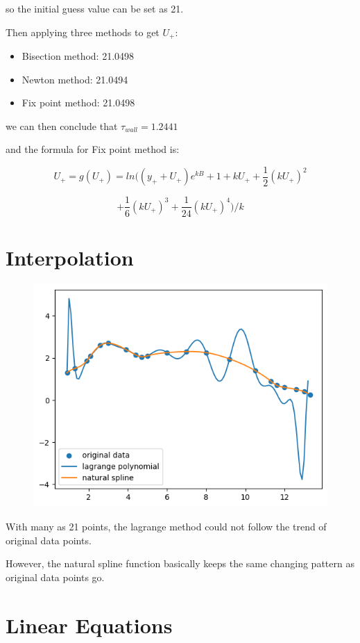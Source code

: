 \documentclass[conference]{IEEEtran}
\begin{document}
so the initial guess value can be set as 21.

Then applying three methods to get $U_+$:

\begin{itemize}
	\item Bisection method: 21.0498
	\item Newton method: 21.0494
	\item Fix point method: 21.0498
\end{itemize}

we can then conclude that $\tau_{wall} = 1.2441$

and the formula for Fix point method is:

$$
U_+ = g(U_+) = ln((y_+ + U_+)e^{kB} + 1 + kU_+ + \frac12(kU_+)^2
$$

$$
 + \frac16(kU_+)^3 + \frac{1}{24}(kU_+)^4) / k
$$

\section{Interpolation}

\begin{figure}[htbp]
	\centerline{\includegraphics[width=0.9\columnwidth]{4-1.png}}
\end{figure}

With many as 21 points, the lagrange method could not follow the trend of original data points.

However, the natural spline function basically keeps the same changing pattern as original data points go.

\section{Linear Equations}
\end{document}
